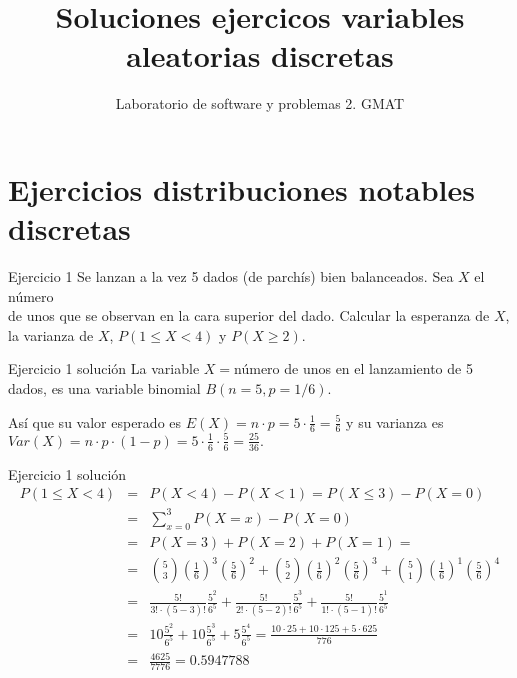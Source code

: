 \documentclass[
  ignorenonframetext,
]{beamer}
\title{Soluciones ejercicos variables aleatorias discretas}
\author{Laboratorio de software y problemas 2. GMAT}
\date{}
\begin{document}
\frame{\titlepage}

\hypertarget{ejercicios-distribuciones-notables-discretas}{%
\section{Ejercicios distribuciones notables
discretas}\label{ejercicios-distribuciones-notables-discretas}}

\begin{frame}{Ejercicio 1}
\protect\hypertarget{ejercicio-1}{}
Se lanzan a la vez 5 dados (de parchís) bien balanceados. Sea \(X\) el
número\\
de unos que se observan en la cara superior del dado. Calcular la
esperanza de \(X\), la varianza de \(X\), \(P(1\leq X<4)\) y
\(P(X\geq 2).\)
\end{frame}

\begin{frame}{Ejercicio 1 solución}
\protect\hypertarget{ejercicio-1-soluciuxf3n}{}
La variable \(X=\)número de unos en el lanzamiento de 5 dados, es una
variable binomial \(B(n=5,p=1/6)\).

Así que su valor esperado es
\(E(X)=n\cdot p = 5\cdot \frac{1}{6}=\frac56\) y su varianza es
\(Var(X)=n\cdot p\cdot (1-p)= 5\cdot \frac16\cdot \frac56=\frac{25}{36}.\)
\end{frame}

\begin{frame}{Ejercicio 1 solución}
\protect\hypertarget{ejercicio-1-soluciuxf3n-1}{}
\[
\begin{array}{lll}
P(1\leq X< 4)&=&P(X<4)-P(X<1)=P(X\leq 3)-P(X=0)\\
&=&\sum_{x=0}^3 P(X=x)-P(X=0)\\
&=&
P(X=3)+P(X=2)+P(X=1)=
\\
&=& {5 \choose 3} \left(\frac16\right)^3 \left(\frac56\right)^2+
{5 \choose 2} \left(\frac16\right)^2 \left(\frac56\right)^3+
{5 \choose 1} \left(\frac16\right)^1 \left(\frac56\right)^4
\\
&=&
\frac{5!}{3!\cdot (5-3)!} \frac{5^2}{6^5}+
\frac{5!}{2!\cdot (5-2)!} \frac{5^3}{6^5}+
\frac{5!}{1!\cdot (5-1)!} \frac{5^1}{6^5} \\
&=&
10 \frac{5^2}{6^5}+
10 \frac{5^3}{6^5}+
5 \frac{5^4}{6^5}=\frac{10\cdot 25 +10 \cdot 125 +5\cdot 625}{776}\\&=&
\frac{4625}{7776}=0.5947788 
\end{array}
\]
\end{frame}
\end{document}
